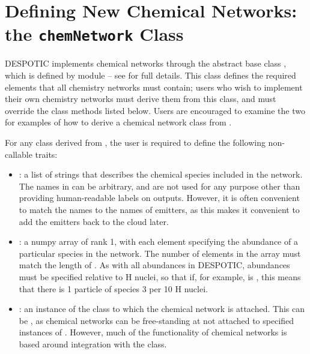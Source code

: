 \documentclass[letterpaper,10pt,english]{sphinxmanual}
\begin{document}
\section{Defining New Chemical Networks: the \texttt{chemNetwork} Class}
\label{chemistry:defining-new-chemical-networks-the-chemnetwork-class}\label{chemistry:ssec-chemnetworks}
DESPOTIC implements chemical networks through the abstract base class
, which is defined by module
 -- see {\hyperref[fulldoc:sec-fulldoc]{\emph{}}} for full
details. This class defines the required elements that all chemistry
networks must contain; users who wish to implement their own chemistry
networks must derive them from this class, and must override the class
methods listed below. Users are encouraged to examine the two
{\hyperref[chemistry:ssec-predefined-networks]{\emph{}}} for examples of how to derive a
chemical network class from .

For any class  derived from , the user is
required to define the following non-callable traits:
\begin{itemize}
\item {} 
: a list of strings that describes the chemical
species included in the network. The names in  can be
arbitrary, and are not used for any purpose other than providing
human-readable labels on outputs. However, it is often convenient to
match the names to the names of emitters, as this makes it
convenient to add the emitters back to the cloud later.

\item {} 
: a numpy array of rank 1, with each element specifying the
abundance of a particular species in the network. The number of
elements in the array must match the length of . As
with all abundances in DESPOTIC, abundances must be specified
relative to H nuclei, so that if, for example,  is ,
this means that there is 1 particle of species 3 per 10 H nuclei.

\item {} 
: an instance of the  class to which the
chemical network is attached. This can be , as chemical
networks can be free-standing at not attached to specified instances
of . However, much of the functionality of chemical
networks is based around integration with the  class.

\end{itemize}
\end{document}

